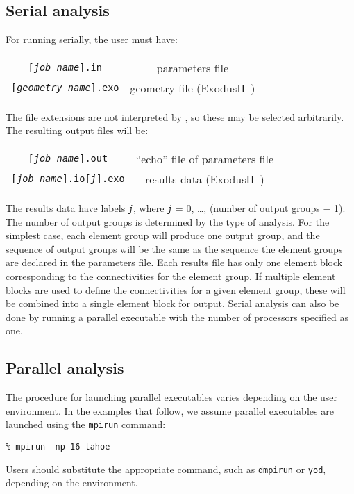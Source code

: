 \subsection{Serial analysis}
\label{sect.serial.analysis}
For running serially, the user must have:
\begin{center}
\begin{tabular}[c]{c c}
\parbox[b]{3.0in}{\raggedleft \texttt{[\textsl{job name}].in}} 
&\parbox[b]{3.0in}{parameters file}\\
\parbox[b]{3.0in}{\raggedleft \texttt{[\textsl{geometry name}].exo}} 
&\parbox[b]{3.0in}{geometry file (\textsf{ExodusII}~\cite{ExodusII})}\\
\end{tabular}
\end{center}
The file extensions are not interpreted by \tahoe, so these may be selected
arbitrarily.  The resulting output files will be:
\begin{center}
\begin{tabular}[c]{c c}
 \parbox[b]{3.0in}{\raggedleft \texttt{[\textsl{job name}].out}} 
&\parbox[b]{3.0in}{``echo'' file of parameters file}\\
 \parbox[b]{3.0in}{\raggedleft \texttt{[\textsl{job name}].io[\textsl{j}].exo}} 
&\parbox[b]{3.0in}{results data (\textsf{ExodusII}~\cite{ExodusII})}\\
\end{tabular}
\end{center}
The results data have labels \texttt{\textsl{j}}, 
where \texttt{\textsl{j}} = 0, \ldots, (number of output groups $-$ 1).  
The number of output groups is determined by the type of analysis. 
For the simplest case, each element group will produce one output group,
and the sequence of output groups will be the same as the sequence the
element groups are declared in the parameters file.  Each results file has
only one element block corresponding to the connectivities for the element
group.  If multiple element blocks are used to define the connectivities
for a given element group, these will be combined into a single element
block for output.  Serial analysis can also be done by running a parallel
executable with the number of processors specified as one.

\subsection{Parallel analysis}
\label{sect.parallel.analysis}
The procedure for launching parallel executables varies depending on the
user environment.  In the examples that follow, we assume parallel
executables are launched using the \texttt{mpirun} command:
\begin{center}
	\texttt{\% mpirun -np 16 tahoe}
\end{center}
Users should substitute the appropriate command, such as \texttt{dmpirun} 
or \texttt{yod}, depending on the environment.

